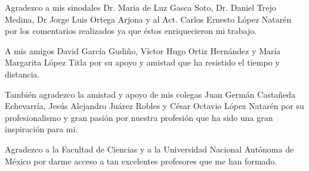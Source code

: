 \documentclass[letterpaper,twoside,openright]{book}
\begin{document}
Agradezco a mis sinodales Dr. Maria de Luz Gasca Soto, Dr. Daniel Trejo Medina, Dr
Jorge Luis Ortega Arjona y al Act. Carlos Ernesto López Natarén por los comentarios
realizados ya que éstos enriquecieron mi trabajo.

A mis amigos David García Gudiño, Víctor Hugo Ortiz Hernández y
María Margarita López Titla por su apoyo y amistad que ha resistido el tiempo y
distancia.

También agradezco la amistad y apoyo de mis colegas Juan Germán Castañeda Echevarría,
Jesús Alejandro Juárez Robles y César Octavio López Natarén por su profesionalismo y
gran pasión por nuestra profesión que ha sido una gran inspiración para mi.

Agradezco a la Facultad de Ciencias y a la Universidad Nacional Autónoma de México
por darme acceso a tan excelentes profesores que me han formado.

\tableofcontents

\mainmatter








\backmatter



\printbibliography
\end{document}
